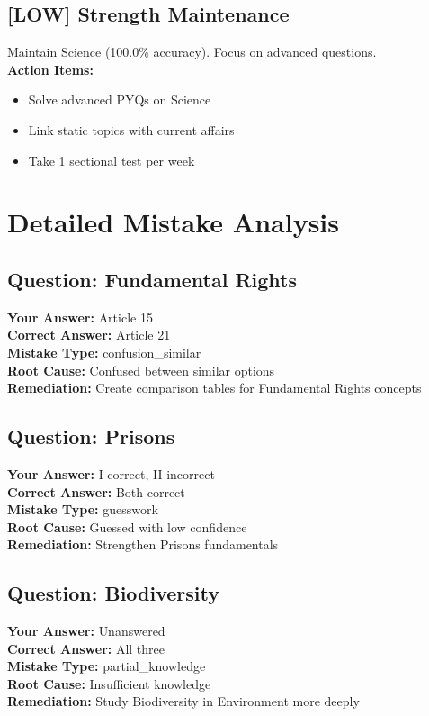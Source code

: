\documentclass[a4paper,12pt]{article}
\begin{document}
\subsection*{[LOW] Strength Maintenance}
Maintain Science (100.0\% accuracy). Focus on advanced questions.\\
\textbf{Action Items:}
\begin{itemize}
\item Solve advanced PYQs on Science
\item Link static topics with current affairs
\item Take 1 sectional test per week
\end{itemize}
\section{Detailed Mistake Analysis}
\subsection*{Question: Fundamental Rights}
\textbf{Your Answer:} \textcolor{wrongred}{Article 15} \\
\textbf{Correct Answer:} Article 21\\
\textbf{Mistake Type:} confusion\_similar\\
\textbf{Root Cause:} Confused between similar options\\
\textbf{Remediation:} Create comparison tables for Fundamental Rights concepts\\
\subsection*{Question: Prisons}
\textbf{Your Answer:} \textcolor{wrongred}{I correct, II incorrect} \\
\textbf{Correct Answer:} Both correct\\
\textbf{Mistake Type:} guesswork\\
\textbf{Root Cause:} Guessed with low confidence\\
\textbf{Remediation:} Strengthen Prisons fundamentals\\
\subsection*{Question: Biodiversity}
\textbf{Your Answer:} \textcolor{wrongred}{Unanswered} \\
\textbf{Correct Answer:} All three\\
\textbf{Mistake Type:} partial\_knowledge\\
\textbf{Root Cause:} Insufficient knowledge\\
\textbf{Remediation:} Study Biodiversity in Environment more deeply\\
\end{document}
